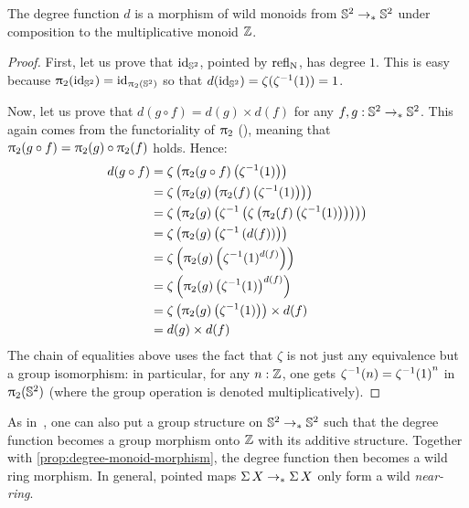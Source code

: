 \documentclass[english,a4paper]{lmcs}
\begin{document}
\begin{prop}\label{prop:degree-monoid-morphism}
  The degree function $d$ is a morphism of wild monoids from ${{\mathbb S^{2}}} \to_\ast {{\mathbb S^{2}}}$
  under composition
  to the multiplicative monoid $\mathbb{Z}$.
  \label{prop:deg-monoid-morphism}
\end{prop}
\begin{proof}
  First, let us prove that $\mathord{\mathrm{id}}_{{\mathbb S^{2}}}$, pointed by $\mathop{{\mathrm{refl}}_{\mathrm{N}}}$, has degree $1$.
  This is easy because $\uppi_{2}(\mathord{\mathrm{id}}_{{\mathbb S^{2}}}) = \mathord{\mathrm{id}}_{\uppi_{2}({{\mathbb S^{2}}})}$ so that $d(\mathord{\mathrm{id}}_{{\mathbb S^{2}}})
  = \zeta(\zeta^{-1}(1)) = 1$.

  Now, let us prove that $d(g\circ f) = d(g)\times d(f)$ for any $f,g:{{\mathbb S^{2}}}
  \to_\ast{{\mathbb S^{2}}}$. This again comes from the functoriality of $\uppi_{2}$
  (\cite[after Lem.\ 7.3.3 and before Def.\ 8.4.2]{HoTT}),
  meaning that $\uppi_{2}(g\circ f) = \uppi_{2}(g)\circ\uppi_{2}(f)$
  holds. Hence:
  \begin{align*}
    d(g\circ f) &= \zeta\left( \uppi_{2}(g\circ f)\left( \zeta^{-1}(1) \right) \right)
    \\
    &= \zeta\left( \uppi_{2}(g) \left( \uppi_{2}(f)\left( \zeta^{-1}(1) \right)
    \right) \right)
    \\
    &= \zeta\left( \uppi_{2}(g) \left( \zeta^{-1} \left( \zeta \left( \uppi_{2}(f)\left( \zeta^{-1}(1) \right)
    \right) \right) \right) \right)
    \\
    &= \zeta \left( \uppi_{2}(g) \left( \zeta^{-1} \left(d(f)\right) \right) \right)
    \\
    &= \zeta \left( \uppi_{2}(g) \left( \zeta^{-1}(1)^{d(f)} \right) \right)
    \\
    &= \zeta \left( \uppi_{2}(g) \left( \zeta^{-1}(1)\right)^{d(f)} \right)
    \\
    &= \zeta \left( \uppi_{2}(g) \left( \zeta^{-1}(1)\right) \right)\times d(f)
    \\
    &= d(g)\times d(f)
  \end{align*}
  The chain of equalities above uses the fact that $\zeta$ is not just any
  equivalence but a group isomorphism: in particular, for any $n:\mathbb{Z}$, one
  gets $\zeta^{-1}(n) = {\zeta^{-1}(1)}^n$ in $\uppi_{2}({{\mathbb S^{2}}})$ (where the group
  operation is denoted multiplicatively).
\end{proof}

\begin{rem}
  As in~\cite{Buchholtz2018CellularCI}, one can also put a group structure
  on ${{\mathbb S^{2}}} \to_\ast {{\mathbb S^{2}}}$ such that the degree function becomes a
  group morphism onto $\mathbb{Z}$ with its additive structure.
  Together with \cref{prop:degree-monoid-morphism},
  the degree function then becomes a wild ring morphism.
  In general, pointed maps $\operatorname{\Sigma} X \to_\ast \operatorname{\Sigma} X$ only form a wild \emph{near-ring}.
\end{rem}
\end{document}
